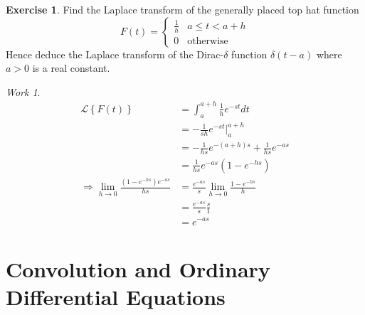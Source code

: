 \documentclass{report}
\theoremstyle{definition}
\newtheorem{exercise}{Exercise}[chapter]
\theoremstyle{remark}
\newtheorem*{work}{Work}
\newcommand{\lapt}[1]{\mathscr{L}\left\{ #1\right\}}
\begin{document}
\begin{exercise}
    Find the Laplace transform of the generally placed top hat function 
    \begin{equation*}
        F(t) = \begin{cases}
            \frac{1}{h} &a\leq t < a+h\\ 0 &\text{otherwise}
        \end{cases}
    \end{equation*}
    Hence deduce the Laplace transform of the Dirac-$\delta$ function $\delta(t-a)$ where $a>0$ is a real constant.
\end{exercise}
\begin{work}
    \begin{equation*}
        \begin{split}
            \lapt{F(t)} &= \int^{a+h}_{a}\frac{1}{h}e^{-st}dt \\
            &=-\frac{1}{sh}e^{-st}\Bigg|^{a+h}_a \\
            &= -\frac{1}{hs}e^{-(a+h)s}+
            \frac{1}{hs}e^{-as} \\
            &= \frac{1}{hs}e^{-as}(1-e^{-hs}) \\
            \Rightarrow\lim_{h\rightarrow 0} \frac{(1-e^{-hs})e^{-as}}{hs} &=\frac{e^{-as}}{s}\lim_{h\rightarrow0}\frac{1-e^{-hs}}{h}\\
            &=\frac{e^{-as}}{s} \frac{s}{1} \\
            &=e^{-as}
        \end{split}
    \end{equation*}
\end{work}

\chapter{Convolution and Ordinary Differential Equations}
\end{document}
